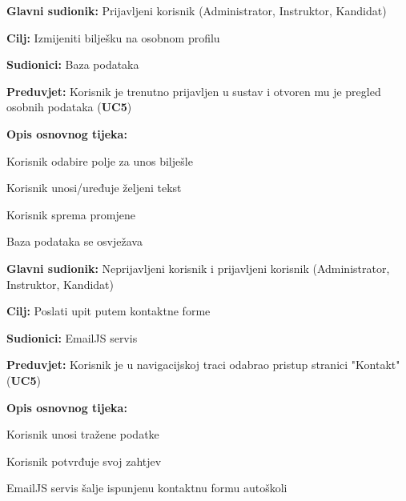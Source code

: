 \noindent {}
\begin{packed_item}
	
	\item \textbf{Glavni sudionik:} Prijavljeni korisnik (Administrator, Instruktor, Kandidat)
	\item  \textbf{Cilj:} Izmijeniti bilješku na osobnom profilu 
	\item  \textbf{Sudionici:} Baza podataka
	\item  \textbf{Preduvjet:} Korisnik je trenutno prijavljen u sustav i otvoren mu je pregled osobnih podataka (\textbf{UC5})
	\item  \textbf{Opis osnovnog tijeka:}
	
	\item[] \begin{packed_enum}
		
		\item Korisnik odabire polje za unos bilješle
		\item Korisnik unosi/uređuje željeni tekst 
		\item Korisnik sprema promjene
		\item Baza podataka se osvježava 
		
	\end{packed_enum}
	
\end{packed_item}

\noindent {}
\begin{packed_item}
	
	\item \textbf{Glavni sudionik:} Neprijavljeni korisnik i prijavljeni korisnik (Administrator, Instruktor, Kandidat)
	\item  \textbf{Cilj:} Poslati upit putem kontaktne forme 
	\item  \textbf{Sudionici:} EmailJS servis
	\item  \textbf{Preduvjet:} Korisnik je u navigacijskoj traci odabrao pristup stranici "Kontakt"
 (\textbf{UC5})
	\item  \textbf{Opis osnovnog tijeka:}
	
	\item[] \begin{packed_enum}
		
		\item Korisnik unosi tražene podatke
		\item Korisnik potvrđuje svoj zahtjev  
		\item EmailJS servis šalje ispunjenu kontaktnu formu autoškoli
		
	\end{packed_enum}
	
\end{packed_item}

